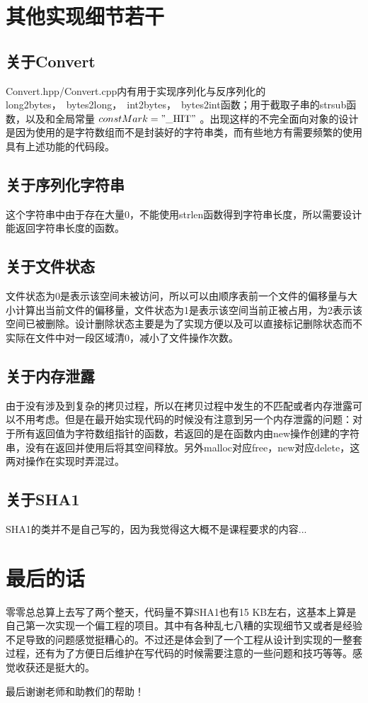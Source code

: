 \documentclass[11pt, a4paper]{article}
\begin{document}
\begin{CJK*}{UTF8}{gbsn}
	\section{其他实现细节若干}
		\subsection{关于Convert}
			Convert.hpp/Convert.cpp内有用于实现序列化与反序列化的long2bytes，\ bytes2long，\  int2bytes，\ bytes2int函数；用于截取子串的strsub函数，以及和全局常量 $constMark= "\_\mathrm{HIT}"$ 。出现这样的不完全面向对象的设计是因为使用的是字符数组而不是封装好的字符串类，而有些地方有需要频繁的使用具有上述功能的代码段。
		\subsection{关于序列化字符串}
			这个字符串中由于存在大量0，不能使用strlen函数得到字符串长度，所以需要设计能返回字符串长度的函数。
		\subsection{关于文件状态}
			文件状态为0是表示该空间未被访问，所以可以由顺序表前一个文件的偏移量与大小计算出当前文件的偏移量，文件状态为1是表示该空间当前正被占用，为2表示该空间已被删除。设计删除状态主要是为了实现方便以及可以直接标记删除状态而不实际在文件中对一段区域清0，减小了文件操作次数。
			
		\subsection{关于内存泄露}
			由于没有涉及到复杂的拷贝过程，所以在拷贝过程中发生的不匹配或者内存泄露可以不用考虑。但是在最开始实现代码的时候没有注意到另一个内存泄露的问题：对于所有返回值为字符数组指针的函数，若返回的是在函数内由new操作创建的字符串，没有在返回并使用后将其空间释放。另外malloc对应free，new对应delete，这两对操作在实现时弄混过。
			
		\subsection{关于SHA1}
			SHA1的类并不是自己写的，因为我觉得这大概不是课程要求的内容...
			
	\section{最后的话}
		零零总总算上去写了两个整天，代码量不算SHA1也有15 KB左右，这基本上算是自己第一次实现一个偏工程的项目。其中有各种乱七八糟的实现细节又或者是经验不足导致的问题感觉挺糟心的。不过还是体会到了一个工程从设计到实现的一整套过程，还有为了方便日后维护在写代码的时候需要注意的一些问题和技巧等等。感觉收获还是挺大的。
		
		最后谢谢老师和助教们的帮助！
			
	\newpage
	\end{CJK*}
\end{document}
